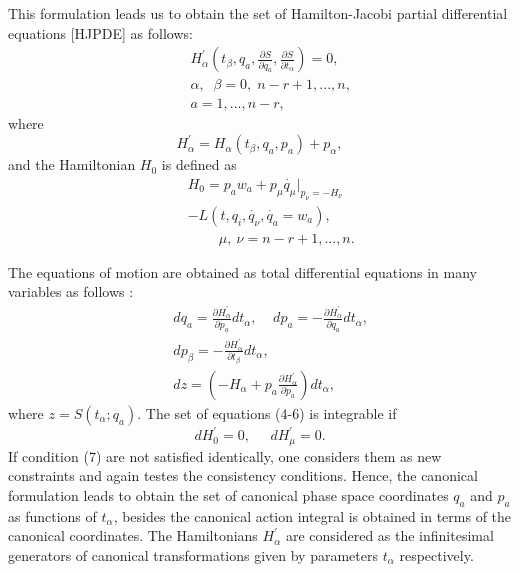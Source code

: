 \documentclass[a4paper,12pt]{article}
\begin{document}
This formulation leads us to obtain the set of Hamilton-Jacobi
partial differential equations [HJPDE] as follows:
\begin{eqnarray} &&H^{'}_{\alpha}\left(t_{\beta}, q_a, \frac{\partial
S}{\partial q_a},\frac{\partial S}{\partial t_{\alpha}}\right)
=0,\nonumber\\&&\alpha,\;\; \beta=0,\;n-r+1,...,n,
\nonumber\\&&a=1,...,n-r,
\end{eqnarray}
 where
\begin{equation}
H^{'}_{\alpha}=H_{\alpha}(t_{\beta}, q_a, p_a) + p_{\alpha},
\end{equation}
and the Hamiltonian $H_{0}$ is defined as
\begin{eqnarray}
 &&H_{0}= p_{a}w_{a}+
p_{\mu}
 \dot{q_{\mu}}|_{p_{\nu}=-H_{\nu}}\nonumber\\&&-
L(t, q_i, \dot{q_{\nu}},
\dot{q_{a}}=w_a),\nonumber\\&&\;\;\;\;\;\;\;\;\mu,~\nu=n-r+1,...,n.
\end{eqnarray}

The equations of motion are obtained as total differential
equations in many variables as follows \cite{gl}:
\begin{eqnarray}
 &&dq_a=\frac{\partial H^{'}_{\alpha}}{\partial
 p_a}dt_{\alpha},\;\;\;\;
 dp_a= -\frac{\partial H^{'}_{\alpha}}{\partial q_a}dt_{\alpha},\\
&&dp_{\beta}= -\frac{\partial H^{'}_{\alpha}}{\partial t_{\beta}}dt_{\alpha},\\
&& dz=\left(-H_{\alpha}+ p_a \frac{\partial
H^{'}_{\alpha}}{\partial p_a}\right)dt_{\alpha},
\end{eqnarray}
where $z=S(t_{\alpha};q_a)$. The set of equations (4-6) is
integrable
 if \cite{sm2}
\begin{equation}
dH^{'}_{0}=0,\;\;\;\;\;dH^{'}_{\mu}=0.
\end{equation}
If condition (7) are not satisfied identically, one considers
them as new constraints and again testes the consistency
conditions. Hence, the canonical formulation leads to obtain the
set of canonical phase space coordinates $q_a$ and $p_a$ as
functions of $t_{\alpha}$, besides the canonical action integral
is obtained in terms of the canonical coordinates. The
Hamiltonians $H^{'}_{\alpha}$ are considered as the infinitesimal
generators of canonical transformations given by parameters
$t_{\alpha}$ respectively.
\end{document}
